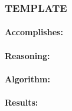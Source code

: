 \subsubsection{TEMPLATE}
\label{subsubsec:TEMPLATE}

\paragraph*{Accomplishes:}\mbox{}\par

\paragraph*{Reasoning:}\mbox{}\par

\paragraph*{Algorithm:}\mbox{}\par

\paragraph*{Results:}\mbox{}\par
